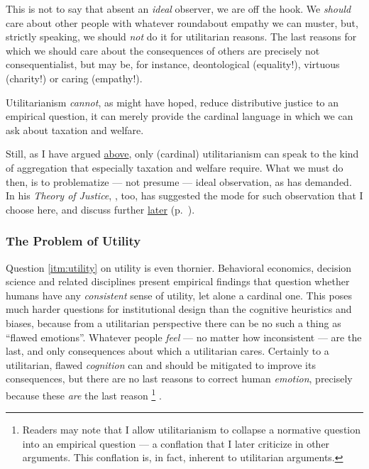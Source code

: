 This is not to say that absent an \emph{ideal} observer, we are off the hook. We \emph{should} care about other people with whatever roundabout empathy we can muster, but, strictly speaking, we should \emph{not} do it for utilitarian reasons.
The last reasons for which we should care about the consequences of others are precisely not consequentialist, but may be, for instance, deontological (equality!), virtuous (charity!) or caring (empathy!). %

Utilitarianism \emph{cannot}, as \cite{Bentham1789} might have hoped, reduce distributive justice to an empirical question, it can merely provide the cardinal language in which we can ask about taxation and welfare.

Still, as I have argued \hyperref[sec:consequentialism]{above}, only (cardinal) utilitarianism can speak to the kind of aggregation that especially taxation and welfare require.%
What we must do then, is to problematize --- not presume --- ideal observation, as \citealt{Rawls1988} has demanded.
In his \emph{Theory of Justice}, \citeauthor{Rawls-1971}, too, has suggested the mode for such observation that I choose here, and discuss further \hyperref[sec:fair]{later} (p.~\pageref{sec:fair}).

\subsubsection[Utility]{The Problem of Utility} \label{sec:utility}

Question \ref{itm:utility} on utility is even thornier.
Behavioral economics, decision science and related disciplines present empirical findings that question whether humans have any \emph{consistent} sense of utility, let alone a cardinal one.
This poses much harder questions for institutional design than the cognitive heuristics and biases, because from a utilitarian perspective there can be no such a thing as ``flawed emotions''.
Whatever people \emph{feel} --- no matter how inconsistent --- are the last, and only consequences about which a utilitarian cares.
Certainly to a utilitarian, flawed \emph{cognition} can and should be mitigated to improve its consequences, but there are no last reasons to correct human \emph{emotion}, precisely because these \emph{are} the last reason
\footnote{
	Readers may note that I allow utilitarianism to collapse a normative question into an empirical question --- a conflation that I later criticize in other arguments. %
	This conflation is, in fact, inherent to utilitarian arguments.
}
.

